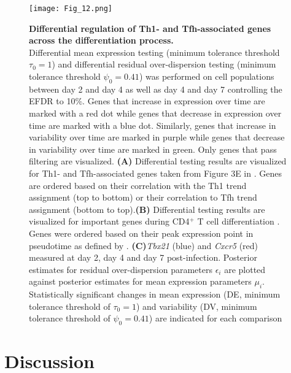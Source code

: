 \begin{figure}[!h]
  \begin{minipage}[c]{0.57\textwidth}
    \texttt{[image: Fig\_12.png]}
  \end{minipage}\hfill
  \begin{minipage}[c]{0.4\textwidth}
\caption{\textbf{Differential regulation of Th1- and Tfh-associated genes across the differentiation process.}\\
Differential mean expression testing (minimum tolerance threshold $\tau_0=1$) and differential residual over-dispersion testing (minimum tolerance threshold $\psi_0=0.41$) was performed on cell populations between day 2 and day 4 as well as day 4 and day 7 controlling the EFDR to 10\%. Genes that increase in expression over time are marked with a red dot while genes that decrease in expression over time are marked with a blue dot. Similarly, genes that increase in variability over time are marked in purple while genes that decrease in variability over time are marked in green. Only genes that pass filtering are visualized. \textbf{(A)} Differential testing results are visualized for Th1- and Tfh-associated genes taken from Figure 3E in \cite{Lonnberg2017}. Genes are ordered based on their correlation with the Th1 trend assignment (top to bottom) or their correlation to Tfh trend assignment (bottom to top).\textbf{(B)} Differential testing results are visualized for important genes during CD4$^+$ T cell differentiation \citep[taken from Figure 5A in][]{Lonnberg2017}. Genes were ordered based on their peak expression point in pseudotime as defined by \cite{Lonnberg2017}. \textbf{(C)}\textit{Tbx21} (blue) and \textit{Cxcr5} (red) measured at day 2, day 4 and day 7 post-infection. Posterior estimates for residual over-dispersion parameters $\epsilon_i$ are plotted against posterior estimates for mean expression parameters $\mu_i$. Statistically significant changes in mean expression (DE, minimum tolerance threshold of $\tau_0=1$) and variability (DV, minimum tolerance threshold of $\psi_0=0.41$) are indicated for each comparison} \label{fig2:immune_differentiation2}
  \end{minipage}
\end{figure}

\newpage


\section{Discussion}

